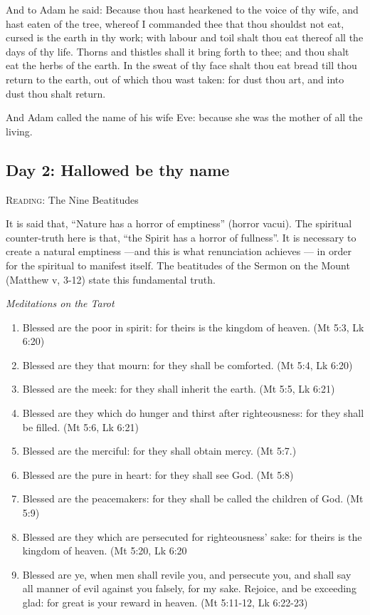 \begin{multicols}{2}
And to Adam he said: Because thou hast hearkened to the voice of thy wife, and hast eaten of the tree, whereof I
commanded thee that thou shouldst not eat, cursed is the earth in thy work; with labour and toil shalt thou eat thereof
all the days of thy life. Thorns and thistles shall it bring forth to thee; and thou shalt eat the herbs of the earth.
In the sweat of thy face shalt thou eat bread till thou return to the earth, out of which thou wast taken: for dust
thou art, and into dust thou shalt return.

And Adam called the name of his wife Eve: because she was the mother of all the living. 
\end{multicols}

\subsection*{Day 2: Hallowed be thy name}
\textsc{Reading}: The Nine Beatitudes

\begin{quotationx}
It is said that, “Nature has a horror of emptiness” (horror vacui). The spiritual counter-truth here is that, “the
Spirit has a horror of fullness”. It is necessary to create a natural emptiness —and this is what
renunciation achieves — in order for the spiritual to manifest itself. The beatitudes of the
Sermon on the Mount (Matthew v, 3-12) state this fundamental truth. 

\begin{flushright}\textit{Meditations on the Tarot}\end{flushright}

\end{quotationx}
\begin{enumerate}
\item Blessed are the poor in spirit: for theirs is the kingdom of heaven. (Mt 5:3, Lk 6:20) 
\item Blessed are they that mourn: for they shall be comforted. (Mt 5:4, Lk 6:20) 
\item Blessed are the meek: for they shall inherit the earth. (Mt 5:5, Lk 6:21) 
\item Blessed are they which do hunger and thirst after righteousness: for they shall be filled. (Mt 5:6, Lk 6:21) 
\item Blessed are the merciful: for they shall obtain mercy. (Mt 5:7.) 
\item Blessed are the pure in heart: for they shall see God. (Mt 5:8) 
\item Blessed are the peacemakers: for they shall be called the children of God. (Mt 5:9) 
\item Blessed are they which are persecuted for righteousness' sake: for theirs is the kingdom of
heaven. (Mt 5:20, Lk 6:20 
\item Blessed are ye, when men shall revile you, and persecute you, and shall say all manner of evil against you
falsely, for my sake. Rejoice, and be exceeding glad: for great is your reward in heaven. (Mt 5:11-12, Lk 6:22-23) 
\end{enumerate}

